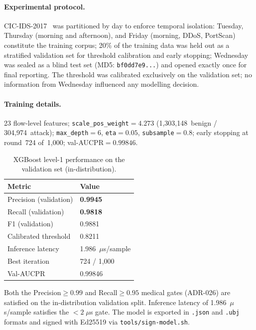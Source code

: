 \documentclass[11pt,a4paper]{article}
\begin{document}
    \paragraph{Experimental protocol.}
    CIC-IDS-2017~\cite{sharafaldin2018} was partitioned by day to enforce temporal isolation:
    Tuesday, Thursday (morning and afternoon), and Friday (morning, DDoS, PortScan) constitute
    the training corpus; 20\% of the training data was held out as a stratified validation set
    for threshold calibration and early stopping; Wednesday was sealed as a blind test set
    (MD5: \texttt{bf0dd7e9...}) and opened exactly once for final reporting.
    The threshold was calibrated exclusively on the validation set; no information
    from Wednesday influenced any modelling decision.

    \paragraph{Training details.}
    23 flow-level features; \texttt{scale\_pos\_weight}$=4.273$ (1,303,148~benign /
    304,974~attack); \texttt{max\_depth}$=6$, \texttt{eta}$=0.05$,
    \texttt{subsample}$=0.8$; early stopping at round~724 of~1,000;
    val-AUCPR$=0.99846$.

    \begin{table}[h]
        \centering
        \caption{XGBoost level-1 performance on the validation set (in-distribution).}
        \label{tab:xgboost_id}
        \begin{tabular}{ll}
            \toprule
            \textbf{Metric} & \textbf{Value} \\
            \midrule
            Precision (validation)  & \textbf{0.9945} \\
            Recall (validation)     & \textbf{0.9818} \\
            F1 (validation)         & 0.9881 \\
            Calibrated threshold    & 0.8211 \\
            Inference latency       & 1.986~$\mu$s/sample \\
            Best iteration          & 724 / 1,000 \\
            Val-AUCPR               & 0.99846 \\
            \bottomrule
        \end{tabular}
    \end{table}

    Both the Precision$\geq0.99$ and Recall$\geq0.95$ medical gates (ADR-026) are satisfied
    on the in-distribution validation split. Inference latency of 1.986~$\mu$s/sample
    satisfies the $<2\;\mu$s gate. The model is exported in \texttt{.json} and \texttt{.ubj}
    formats and signed with Ed25519 via \texttt{tools/sign-model.sh}.
\end{document}
